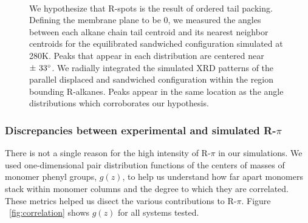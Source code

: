 \documentclass[journal=jpcbfk,manusciprt=article]{achemso}
\begin{document}
\begin{figure}[!htb]
\begin{subfigure}{\linewidth}
\begin{subfigure}{0.45\textwidth}
		\end{subfigure}
	\end{subfigure} 
    \caption{We hypothesize that R-spots is the result of ordered tail packing.
	  Defining the membrane plane to be 0\degree, we measured the angles between each
	  alkane chain tail centroid and its nearest neighbor centroids for the
	  equilibrated sandwiched configuration simulated at 280K. Peaks
	  that appear in each distribution are centered near $\pm~33\degree$. We radially
	  integrated the simulated XRD patterns of the parallel displaced and sandwiched
	  configuration within the region bounding R-alkanes.
	  Peaks appear in the same location as the angle distributions which corroborates
	  our hypothesis.}~\label{fig:tail_packing}
  \end{figure}  


  \subsubsection{Discrepancies between experimental and simulated R-$\pi$}\label{section:rpi}
  
  There is not a single reason for the high intensity of R-$\pi$ in our simulations.
  We used one-dimensional pair distribution functions of the centers of masses of monomer
  phenyl groups, $g(z)$, to help us understand how far apart monomers stack within monomer 
  columns and the degree to which they are correlated. These metrics helped us disect the 
  various contributions to R-$\pi$. Figure ~\ref{fig:correlation} shows $g(z)$ for all 
  systems tested. 
  
  
\end{document}

